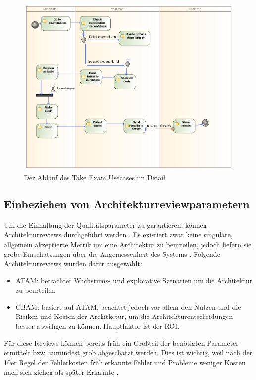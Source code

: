 \begin{figure}[H]
    \centering
    \includegraphics[scale=0.4]{uml/takeexamreq.png}
    \caption{Der Ablauf des Take Exam Usecases im Detail}
\end{figure}

\subsection{Einbeziehen von Architekturreviewparametern}
Um die Einhaltung der Qualitätsparameter zu garantieren, können Architekturreviews durchgeführt werden \cite[S. 20]{review}. Es existiert zwar \glqq keine singuläre, allgemein akzeptierte Metrik um eine Architektur zu beurteilen\grqq \cite[S. 19]{review}, jedoch liefern sie grobe Einschätzungen über die Angemessenheit des Systems \cite[S. 20]{review}. Folgende Architekturreviews wurden dafür ausgewählt:

\begin{itemize}
  \item ATAM: betrachtet Wachstums- und explorative Szenarien um die Architektur zu beurteilen \cite[S. 61]{review}
  \item CBAM: basiert auf ATAM, beachtet jedoch vor allem den Nutzen und die Risiken und Kosten der Architketur, um die Architekturentscheidungen besser abwähgen zu können. Hauptfaktor ist der ROI. \cite[S. 67]{review}
\end{itemize}

Für diese Reviews können bereits früh ein Großteil der benötigten Parameter ermittelt bzw. zumindest grob abgeschätzt werden. Dies ist wichtig, weil nach der 10er Regel der Fehlerkosten früh erkannte Fehler und Probleme weniger Kosten nach sich ziehen als später Erkannte \cite[S. 154]{fehler}.

